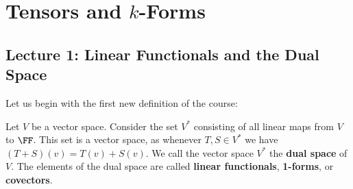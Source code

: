 \section{Tensors and $k$-Forms}
\subsection{Lecture 1: Linear Functionals and the Dual Space}
Let us begin with the first new definition of the course:
\begin{defn} Let $V$ be a vector space. Consider the set $V^*$ consisting of all linear maps from $V$ to $\FF$. This set is a vector space, as whenever $T,S \in V^*$ we have $(T+S)(v) = T(v)+S(v)$. We call the vector space $V^*$ the \textbf{dual space} of $V$. The elements of the dual space are called \textbf{linear functionals}, \textbf{1-forms}, or \textbf{covectors}.
\end{defn}


